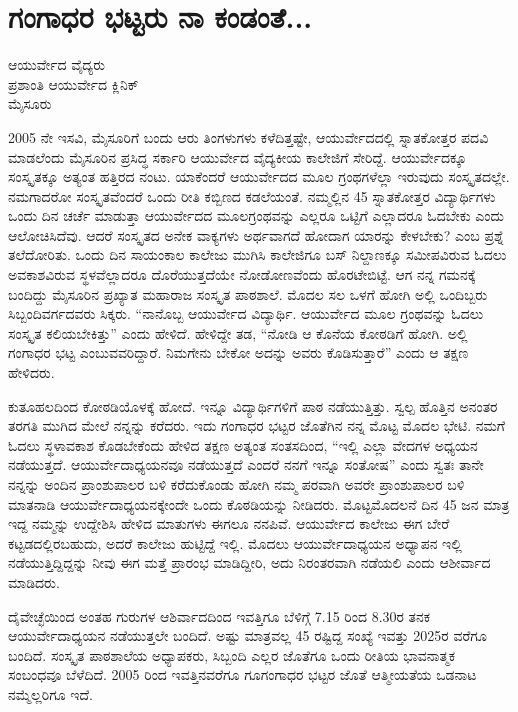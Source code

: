 {\fontsize{14}{16}\selectfont
\chapter{ಗಂಗಾಧರ ಭಟ್ಟರು ನಾ ಕಂಡಂತೆ...}

\begin{center}
\smallskip
ಆಯುರ್ವೇದ ವೈದ್ಯರು\\
ಪ್ರಶಾಂತಿ ಆಯುರ್ವೇದ ಕ್ಲಿನಿಕ್\\
ಮೈಸೂರು
\addrule
\end{center}
2005 ನೇ ಇಸವಿ, ಮೈಸೂರಿಗೆ ಬಂದು ಆರು ತಿಂಗಳುಗಳು ಕಳೆದಿತ್ತಷ್ಟೇ, ಆಯುರ್ವೇದದಲ್ಲಿ ಸ್ನಾತಕೋತ್ತರ ಪದವಿ ಮಾಡಲೆಂದು ಮೈಸೂರಿನ ಪ್ರಸಿದ್ಧ ಸರ್ಕಾರಿ ಆಯುರ್ವೇದ ವೈದ್ಯಕೀಯ ಕಾಲೇಜಿಗೆ ಸೇರಿದ್ದೆ. ಆಯುರ್ವೇದಕ್ಕೂ ಸಂಸ್ಕೃತಕ್ಕೂ ಅತ್ಯಂತ ಹತ್ತಿರದ ನಂಟು. ಯಾಕೆಂದರೆ ಆಯುರ್ವೇದದ ಮೂಲ ಗ್ರಂಥಗಳೆಲ್ಲಾ ಇರುವುದು ಸಂಸ್ಕೃತದಲ್ಲೇ. ನಮಗಾದರೋ ಸಂಸ್ಕೃತವೆಂದರೆ ಒಂದು ರೀತಿ ಕಬ್ಬಿಣದ ಕಡಲೆಯಂತೆ. ನಮ್ಮಲ್ಲಿನ 4\enginline{--}5 ಸ್ನಾತಕೋತ್ತರ ವಿದ್ಯಾರ್ಥಿಗಳು ಒಂದು ದಿನ ಚರ್ಚೆ ಮಾಡುತ್ತಾ ಆಯುರ್ವೇದದ ಮೂಲಗ್ರಂಥವನ್ನು ಎಲ್ಲರೂ ಒಟ್ಟಿಗೆ ಎಲ್ಲಾದರೂ ಓದಬೇಕು ಎಂದು ಆಲೋಚಿಸಿದೆವು. ಆದರೆ ಸಂಸ್ಕೃತದ ಅನೇಕ ವಾಕ್ಯಗಳು ಅರ್ಥವಾಗದೆ ಹೋದಾಗ ಯಾರನ್ನು ಕೇಳಬೇಕು? ಎಂಬ ಪ್ರಶ್ನೆ ತಲೆದೋರಿತು. ಒಂದು ದಿನ ಸಾಯಂಕಾಲ ಕಾಲೇಜು ಮುಗಿಸಿ ಕಾಲೇಜಿಗೂ ಬಸ್ ನಿಲ್ದಾಣಕ್ಕೂ ಸಮೀಪವಿರುವ ಓದಲು ಅವಕಾಶವಿರುವ ಸ್ಥಳವೆಲ್ಲಾದರೂ ದೊರೆಯುತ್ತದೆಯೇ ನೋಡೋಣವೆಂದು ಹೊರಟೇಬಿಟ್ಟೆ. ಆಗ ನನ್ನ ಗಮನಕ್ಕೆ ಬಂದಿದ್ದು ಮೈಸೂರಿನ ಪ್ರಖ್ಯಾತ ಮಹಾರಾಜ ಸಂಸ್ಕೃತ ಪಾಠಶಾಲೆ. ಮೊದಲ ಸಲ ಒಳಗೆ ಹೋಗಿ ಅಲ್ಲಿ ಒಂದಿಬ್ಬರು ಸಿಬ್ಬಂದಿವರ್ಗದವರು ಸಿಕ್ಕರು. “ನಾನೊಬ್ಬ ಆಯುರ್ವೇದ ವಿದ್ಯಾರ್ಥಿ. ಆಯುರ್ವೇದ ಮೂಲ ಗ್ರಂಥವನ್ನು ಓದಲು ಸಂಸ್ಕೃತ ಕಲಿಯಬೇಕಿತ್ತು” ಎಂದು ಹೇಳಿದೆ. ಹೇಳಿದ್ದೇ ತಡ,  “ನೋಡಿ ಆ ಕೊನೆಯ ಕೋಠಡಿಗೆ ಹೋಗಿ. ಅಲ್ಲಿ ಗಂಗಾಧರ ಭಟ್ಟ ಎಂಬುವವರಿದ್ದಾರೆ. ನಿಮಗೇನು ಬೇಕೋ ಅದನ್ನು ಅವರು ಕೊಡಿಸುತ್ತಾರೆ” ಎಂದು ಆ ತಕ್ಷಣ ಹೇಳಿದರು.

ಕುತೂಹಲದಿಂದ ಕೋಠಡಿಯೊಳಕ್ಕೆ ಹೋದೆ. ಇನ್ನೂ ವಿದ್ಯಾರ್ಥಿಗಳಿಗೆ ಪಾಠ ನಡೆಯುತ್ತಿತ್ತು. ಸ್ವಲ್ಪ ಹೊತ್ತಿನ  ಅನಂತರ ತರಗತಿ ಮುಗಿದ ಮೇಲೆ ನನ್ನನ್ನು ಕರೆದರು. ಇದು ಗಂಗಾಧರ ಭಟ್ಟರ ಜೊತೆಗಿನ ನನ್ನ ಮೊಟ್ಟ ಮೊದಲ ಭೇಟಿ. ನಮಗೆ ಓದಲು  ಸ್ಥಳಾವಕಾಶ ಕೊಡಬೇಕೆಂದು ಹೇಳಿದ ತಕ್ಷಣ ಅತ್ಯಂತ ಸಂತಸದಿಂದ, “ಇಲ್ಲಿ ಎಲ್ಲಾ ವೇದಗಳ ಅಧ್ಯಯನ ನಡೆಯುತ್ತದೆ. ಆಯುರ್ವೇದಾಧ್ಯಯನವೂ ನಡೆಯುತ್ತದೆ ಎಂದರೆ ನನಗೆ ಇನ್ನೂ ಸಂತೋಷ” ಎಂದು ಸ್ವತಃ ತಾನೇ ನನ್ನನ್ನು ಅಂದಿನ ಪ್ರಾಂಶುಪಾಲರ ಬಳಿ ಕರೆದುಕೊಂಡು ಹೋಗಿ ನಮ್ಮ ಪರವಾಗಿ ಅವರೇ ಪ್ರಾಂಶುಪಾಲರ ಬಳಿ ಮಾತನಾಡಿ ಆಯುರ್ವೇದಾಧ್ಯಯನಕ್ಕೇಂದೇ ಒಂದು ಕೊಠಡಿಯನ್ನು ನೀಡಿದರು. 
ಮೊಟ್ಟಮೊದಲನೆ ದಿನ 4\enginline{--}5 ಜನ ಮಾತ್ರ ಇದ್ದ ನಮ್ಮನ್ನು ಉದ್ದೇಶಿಸಿ ಹೇಳಿದ ಮಾತುಗಳು ಈಗಲೂ ನನಪಿವೆ. ಆಯುರ್ವೇದ ಕಾಲೇಜು ಈಗ ಬೇರೆ ಕಟ್ಟಡದಲ್ಲಿರಬಹುದು, ಅದರೆ ಕಾಲೇಜು ಹುಟ್ಟಿದ್ದೆ ಇಲ್ಲಿ. ಮೊದಲು ಆಯುರ್ವೇದಾಧ್ಯಯನ ಅಧ್ಯಾಪನ ಇಲ್ಲಿ ನಡೆಯುತ್ತಿದ್ದಿದ್ದನ್ನು ನೀವು ಈಗ ಮತ್ತೆ ಪ್ರಾರಂಭ ಮಾಡಿದ್ದೀರಿ, ಅದು ನಿರಂತರವಾಗಿ ನಡೆಯಲಿ ಎಂದು ಆಶೀರ್ವಾದ ಮಾಡಿದರು. 


ದೈವೇಚ್ಛೆಯಿಂದ ಅಂತಹ ಗುರುಗಳ ಆಶಿರ್ವಾದದಿಂದ ಇವತ್ತಿಗೂ ಬೆಳಿಗ್ಗೆ 7.15 ರಿಂದ 8.30ರ ತನಕ ಆಯುರ್ವೇದಾಧ್ಯಯನ ನಡೆಯುತ್ತಲೇ ಬಂದಿದೆ. ಅಷ್ಟು ಮಾತ್ರವಲ್ಲ 4\enginline{--}5 ರಷ್ಟಿದ್ದ ಸಂಖ್ಯೆ ಇವತ್ತು 20\enginline{-}25ರ ವರೆಗೂ ಬಂದಿದೆ. ಸಂಸ್ಕೃತ ಪಾಠಶಾಲೆಯ ಅಧ್ಯಾಪಕರು, ಸಿಬ್ಬಂದಿ ಎಲ್ಲರ ಜೊತೆಗೂ ಒಂದು ರೀತಿಯ ಭಾವನಾತ್ಮಕ ಸಂಬಂಧವೂ ಬೆಳೆದಿದೆ. 2005 ರಿಂದ ಇವತ್ತಿನವರೆಗೂ ಗೂಗಂಗಾಧರ ಭಟ್ಟರ ಜೊತೆ ಆತ್ಮೀಯತೆಯ ಒಡನಾಟ ನಮ್ಮೆಲ್ಲರಿಗೂ ಇದೆ.

}
